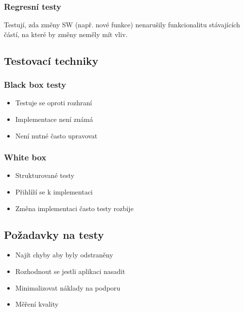     \subsubsection{Regresní testy}
      Testují, zda změny SW (např. nové funkce) nenarušily funkcionalitu stávajících částí, na které by změny
      neměly mít vliv.

  \subsection{Testovací techniky}

    \subsubsection{Black box testy}
      \begin{itemize}
        \item Testuje se oproti rozhraní
        \item Implementace není známá
        \item Není nutné často upravovat
      \end{itemize}

    \subsubsection{White box}
      \begin{itemize}
        \item Strukturované testy
        \item Přihlíží se k implementaci
        \item Změna implementaci často testy rozbije
      \end{itemize}

  \subsection{Požadavky na testy}
    \begin{itemize}
      \item Najít chyby aby byly odstraněny
      \item Rozhodnout se jestli aplikaci nasadit
      \item Minimalizovat náklady na podporu
      \item Měření kvality
    \end{itemize}
